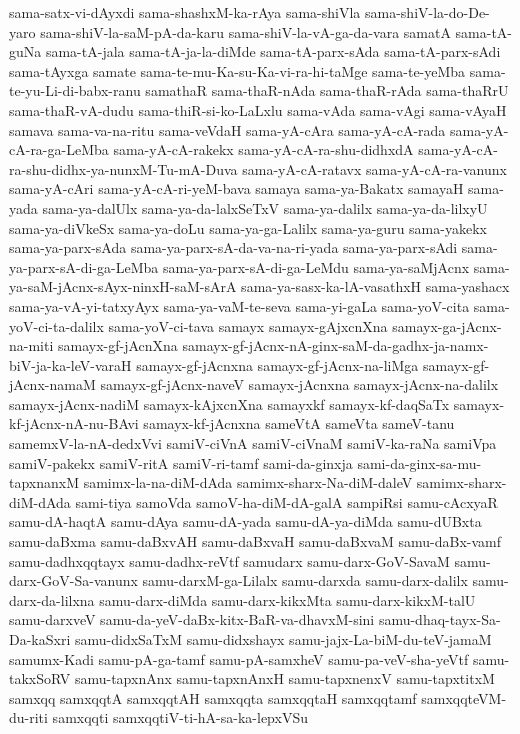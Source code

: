 {sama-satx-vi-dAyxdi
sama-shashxM-ka-rAya
sama-shiVla
sama-shiV-la-do-De-yaro
sama-shiV-la-saM-pA-da-karu
sama-shiV-la-vA-ga-da-vara
samatA
sama-tA-guNa
sama-tA-jala
sama-tA-ja-la-diMde
sama-tA-parx-sAda
sama-tA-parx-sAdi
sama-tAyxga
samate
sama-te-mu-Ka-su-Ka-vi-ra-hi-taMge
sama-te-yeMba
sama-te-yu-Li-di-babx-ranu
samathaR
sama-thaR-nAda
sama-thaR-rAda
sama-thaRrU
sama-thaR-vA-dudu
sama-thiR-si-ko-LaLxlu
sama-vAda
sama-vAgi
sama-vAyaH
samava
sama-va-na-ritu
sama-veVdaH
sama-yA-cAra
sama-yA-cA-rada
sama-yA-cA-ra-ga-LeMba
sama-yA-cA-rakekx
sama-yA-cA-ra-shu-didhxdA
sama-yA-cA-ra-shu-didhx-ya-nunxM-Tu-mA-Duva
sama-yA-cA-ratavx
sama-yA-cA-ra-vanunx
sama-yA-cAri
sama-yA-cA-ri-yeM-bava
samaya
sama-ya-Bakatx
samayaH
sama-yada
sama-ya-dalUlx
sama-ya-da-lalxSeTxV
sama-ya-dalilx
sama-ya-da-lilxyU
sama-ya-diVkeSx
sama-ya-doLu
sama-ya-ga-Lalilx
sama-ya-guru
sama-yakekx
sama-ya-parx-sAda
sama-ya-parx-sA-da-va-na-ri-yada
sama-ya-parx-sAdi
sama-ya-parx-sA-di-ga-LeMba
sama-ya-parx-sA-di-ga-LeMdu
sama-ya-saMjAcnx
sama-ya-saM-jAcnx-sAyx-ninxH-saM-sArA
sama-ya-sasx-ka-lA-vasathxH
sama-yashacx
sama-ya-vA-yi-tatxyAyx
sama-ya-vaM-te-seva
sama-yi-gaLa
sama-yoV-cita
sama-yoV-ci-ta-dalilx
sama-yoV-ci-tava
samayx
samayx-gAjxcnXna
samayx-ga-jAcnx-na-miti
samayx-gf-jAcnXna
samayx-gf-jAcnx-nA-ginx-saM-da-gadhx-ja-namx-biV-ja-ka-leV-varaH
samayx-gf-jAcnxna
samayx-gf-jAcnx-na-liMga
samayx-gf-jAcnx-namaM
samayx-gf-jAcnx-naveV
samayx-jAcnxna
samayx-jAcnx-na-dalilx
samayx-jAcnx-nadiM
samayx-kAjxcnXna
samayxkf
samayx-kf-daqSaTx
samayx-kf-jAcnx-nA-nu-BAvi
samayx-kf-jAcnxna
sameVtA
sameVta
sameV-tanu
samemxV-la-nA-dedxVvi
samiV-ciVnA
samiV-ciVnaM
samiV-ka-raNa
samiVpa
samiV-pakekx
samiV-ritA
samiV-ri-tamf
sami-da-ginxja
sami-da-ginx-sa-mu-tapxnanxM
samimx-la-na-diM-dAda
samimx-sharx-Na-diM-daleV
samimx-sharx-diM-dAda
sami-tiya
samoVda
samoV-ha-diM-dA-galA
sampiRsi
samu-cAcxyaR
samu-dA-haqtA
samu-dAya
samu-dA-yada
samu-dA-ya-diMda
samu-dUBxta
samu-daBxma
samu-daBxvAH
samu-daBxvaH
samu-daBxvaM
samu-daBx-vamf
samu-dadhxqqtayx
samu-dadhx-reVtf
samudarx
samu-darx-GoV-SavaM
samu-darx-GoV-Sa-vanunx
samu-darxM-ga-Lilalx
samu-darxda
samu-darx-dalilx
samu-darx-da-lilxna
samu-darx-diMda
samu-darx-kikxMta
samu-darx-kikxM-talU
samu-darxveV
samu-da-yeV-daBx-kitx-BaR-va-dhavxM-sini
samu-dhaq-tayx-Sa-Da-kaSxri
samu-didxSaTxM
samu-didxshayx
samu-jajx-La-biM-du-teV-jamaM
samumx-Kadi
samu-pA-ga-tamf
samu-pA-samxheV
samu-pa-veV-sha-yeVtf
samu-takxSoRV
samu-tapxnAnx
samu-tapxnAnxH
samu-tapxnenxV
samu-tapxtitxM
samxqq
samxqqtA
samxqqtAH
samxqqta
samxqqtaH
samxqqtamf
samxqqteVM-du-riti
samxqqti
samxqqtiV-ti-hA-sa-ka-lepxVSu
}
